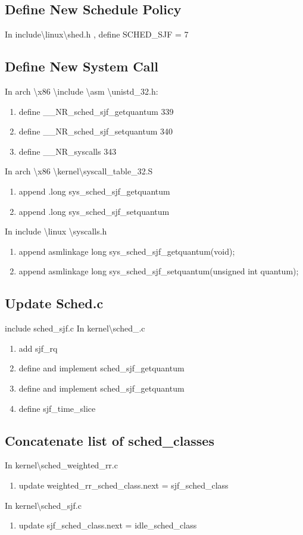 \documentclass[12pt]{article}
\begin{document}
\subsection*{Define New Schedule Policy}
  In include\textbackslash linux\textbackslash shed.h , define SCHED\_SJF = 7
\subsection*{Define New System Call}
In arch \textbackslash x86 \textbackslash include \textbackslash asm \textbackslash unistd\_32.h:
  \begin{enumerate}
      \item define \_\_NR\_sched\_sjf\_getquantum 339
      \item define \_\_NR\_sched\_sjf\_setquantum 340
      \item define \_\_NR\_syscalls 343
  \end{enumerate}
In arch \textbackslash x86 \textbackslash kernel\textbackslash syscall\_table\_32.S
  \begin{enumerate}
    \item append .long sys\_sched\_sjf\_getquantum
  	\item append .long sys\_sched\_sjf\_setquantum
  \end{enumerate}
In include \textbackslash linux \textbackslash syscalls.h
  \begin{enumerate}
    \item append asmlinkage long sys\_sched\_sjf\_getquantum(void);
    \item append asmlinkage long sys\_sched\_sjf\_setquantum(unsigned int quantum);
  \end{enumerate}
\subsection*{Update Sched.c}
  include sched\_sjf.c
  In kernel\textbackslash sched\_.c
  \begin{enumerate}
    \item add sjf\_rq
    \item define and implement sched\_sjf\_getquantum
    \item define and implement sched\_sjf\_getquantum
    \item define sjf\_time\_slice
  \end{enumerate}

\subsection*{Concatenate list of sched\_classes}
  In kernel\textbackslash sched\_weighted\_rr.c
  \begin{enumerate}
    \item update weighted\_rr\_sched\_class.next = sjf\_sched\_class
  \end{enumerate}
  In kernel\textbackslash sched\_sjf.c
  \begin{enumerate}
    \item update sjf\_sched\_class.next = idle\_sched\_class
  \end{enumerate}
\end{document}
